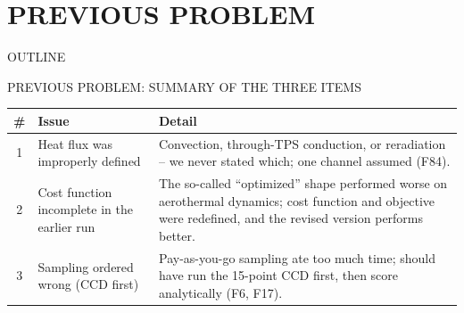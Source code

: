 \documentclass[aspectratio=169,11pt]{beamer}
\begin{document}
{
\begin{frame}[plain]
  \ITBTitleBackground   %
  \titlepage
\end{frame}   %
}

\section{PREVIOUS PROBLEM}

\begin{frame}{OUTLINE}              %
  \tableofcontents[hideallsubsections]
\end{frame}

\begin{frame}{PREVIOUS PROBLEM: SUMMARY OF THE THREE ITEMS}   %
  \small
  \begin{tabular}{@{}c@{\,~}p{5.5cm}@{\,~}p{5.5cm}@{}}
    \textbf{\#} & \textbf{Issue} & \textbf{Detail} \\
    \hline
    1 & Heat flux was improperly defined &
    Convection, through-TPS conduction, or reradiation -- we never stated which; one channel assumed (F84). \\ \hline
    2 & Cost function incomplete in the earlier run &
    The so-called ``optimized'' shape performed worse on aerothermal dynamics; cost function and objective were redefined, and the revised version performs better. \\ \hline
    3 & Sampling ordered wrong (CCD first) &
    Pay-as-you-go sampling ate too much time; should have run the 15-point CCD first, then score analytically (F6, F17). \\
  \end{tabular}
  \vspace{0.4cm}
\end{frame}

\end{document}
